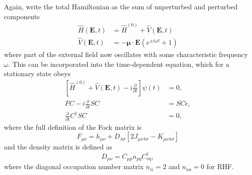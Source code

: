 Again, write the total Hamiltonian as the sum of unperturbed and perturbed components
\begin{align*}
  \hat{H}(\mathbf{E},t) &= \hat{H}^{(0)} + \hat{V}(\mathbf{E},t) \\
  \hat{V}(\mathbf{E},t) &= -\mathbf{\mu} \cdot \mathbf{E}(e^{\pm i \omega t} + 1) \tag{Karna 2}
\end{align*}
where part of the external field now oscillates with some characteristic frequency \(\omega\). This can be incorporated into the time-dependent \schrod{} equation, which for a stationary state obeys
\begin{align*}
  \left[ \hat{H}^{(0)} + \hat{V}(\mathbf{E},t) - i\frac{\partial}{\partial t} \right] \psi(t) &= 0, \tag{Karna 3} \\
  FC - i \frac{\partial}{\partial t} SC &= SC\epsilon, \tag{Karna 5} \\
  \frac{\partial}{\partial t} C^{\dagger} S C &= 0, \tag{Karna 6}
\end{align*}
where the full definition of the Fock matrix is
\begin{equation}
  F_{\mu\nu} = h_{\mu\nu} + D_{\lambda\sigma}[2J_{\mu\nu\lambda\sigma} - K_{\mu\nu\lambda\sigma}] \tag{Karna 9}
\end{equation}
and the density matrix is defined as
\begin{equation}
  D_{\mu\nu} = C_{\mu p}n_{pq}C_{\nu q}^{\dagger}, \tag{Karna 10}
\end{equation}
where the diagonal occupation number matrix \(n_{ii} = 2\) and \(n_{aa} = 0\) for RHF.

